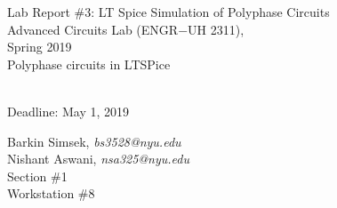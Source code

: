 \documentclass[journal]{IEEEtran}
\begin{document}
\begin{titlepage}
    {\centering
        \vspace*{20em}
        {
        \huge 
        \begin{spacing}{1.5}
            Lab Report \#3: LT Spice Simulation of Polyphase Circuits 
            \\
            Advanced Circuits Lab (ENGR$-$UH 2311),\\
            Spring 2019
            \bigskip
            \Large
            \\
            Polyphase circuits in LTSPice
  
            \\
            \bigskip
            Deadline: May 1, 2019 
        \end{spacing}

        }
        
    }
    \vfill
    
    {
    \large
    
    \begin{spacing}{1.5}
    \noindent Barkin Simsek, {\it {bs3528@nyu.edu}} 
    \\
    Nishant Aswani, {\it {nsa325@nyu.edu}}
    \\
    Section \#1%
    \\
    Workstation \#8%
    \end{spacing}
    }


\end{titlepage}
{}
\setcounter{page}{1}




%
{}


\begin{abstract}
In this lab, the purpose was using the LTSpice software to simulate a wye-wye circuit and measure different properties such as voltages, currents, instantaneous power dissipated, and the average power dissipated at different points of the circuit.

\end{abstract}
\end{document}
